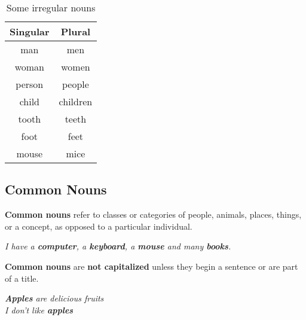 \documentclass[hidelinks,10pt,a4paper]{article}
\begin{document}
\begin{table}[h]
\begin{center}
\begin{tabular}{|c|c|}
\hline
\textbf{Singular} & \textbf{Plural}\\
\hline
man     & men       \\ \hline
woman   & women     \\ \hline
person  & people    \\ \hline
child   & children  \\ \hline
tooth   & teeth     \\ \hline
foot    & feet      \\ \hline
mouse   & mice      \\
\hline
\end{tabular}
\end{center}
\caption{\label{tab:nouns1}Some irregular nouns}
\end{table}


\subsection{Common Nouns}
\textbf{Common nouns} refer to classes or categories of people, animals, places, things, or a concept, as opposed to a particular individual.
\begin{center}
	\textit{I have a \textbf{computer}, a \textbf{keyboard}, a \textbf{mouse} and many \textbf{books}. }
\end{center}
\indent
\textbf{Common nouns} are \textbf{not capitalized} unless they begin a sentence or are part of a title.
\begin{center}
		\textit{
		\textbf{Apples} are delicious fruits\\
				I don't like \textbf{apples} }
\end{center}
\end{document}
